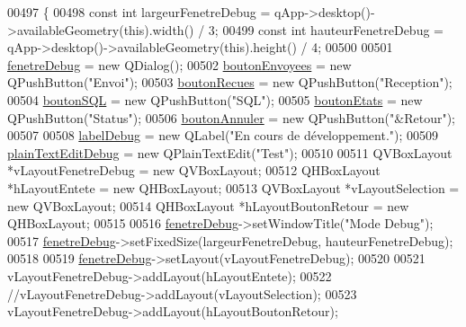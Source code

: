 \begin{DoxyCode}
00497 \{
00498     \textcolor{keyword}{const} \textcolor{keywordtype}{int} largeurFenetreDebug = qApp->desktop()->availableGeometry(\textcolor{keyword}{this}).width() / 3;
00499     \textcolor{keyword}{const} \textcolor{keywordtype}{int} hauteurFenetreDebug = qApp->desktop()->availableGeometry(\textcolor{keyword}{this}).height() / 4;
00500 
00501     \hyperlink{class_i_h_m_rov_a393d23f9256a9db063dfef11d95cdc06}{fenetreDebug} = \textcolor{keyword}{new} QDialog();
00502     \hyperlink{class_i_h_m_rov_a7a441ed53b0066edaf1f0acbea24e777}{boutonEnvoyees} = \textcolor{keyword}{new} QPushButton(\textcolor{stringliteral}{"Envoi"});
00503     \hyperlink{class_i_h_m_rov_ae56bf1c744f0fc393ef517e0e66b0d12}{boutonRecues} = \textcolor{keyword}{new} QPushButton(\textcolor{stringliteral}{"Reception"});
00504     \hyperlink{class_i_h_m_rov_a5dca475dd63a04c96386855a84c5effb}{boutonSQL} = \textcolor{keyword}{new} QPushButton(\textcolor{stringliteral}{"SQL"});
00505     \hyperlink{class_i_h_m_rov_a82f0ceba3dadd7a3d3251c236bf212a4}{boutonEtats} = \textcolor{keyword}{new} QPushButton(\textcolor{stringliteral}{"Status"});
00506     \hyperlink{class_i_h_m_rov_a4a6fec1b4a86c93c1d0d62d66804db5c}{boutonAnnuler} = \textcolor{keyword}{new} QPushButton(\textcolor{stringliteral}{"&Retour"});
00507 
00508     \hyperlink{class_i_h_m_rov_a667455d332d2abf2e42b897e6cc632f8}{labelDebug} = \textcolor{keyword}{new} QLabel(\textcolor{stringliteral}{"En cours de développement."});
00509     \hyperlink{class_i_h_m_rov_ae2a7bec24a52ffd9e53baf1185ab6cd7}{plainTextEditDebug} = \textcolor{keyword}{new} QPlainTextEdit(\textcolor{stringliteral}{"Test"});
00510 
00511     QVBoxLayout *vLayoutFenetreDebug = \textcolor{keyword}{new} QVBoxLayout;
00512     QHBoxLayout *hLayoutEntete = \textcolor{keyword}{new} QHBoxLayout;
00513     QVBoxLayout *vLayoutSelection = \textcolor{keyword}{new} QVBoxLayout;
00514     QHBoxLayout *hLayoutBoutonRetour = \textcolor{keyword}{new} QHBoxLayout;
00515 
00516     \hyperlink{class_i_h_m_rov_a393d23f9256a9db063dfef11d95cdc06}{fenetreDebug}->setWindowTitle(\textcolor{stringliteral}{"Mode Debug"});
00517     \hyperlink{class_i_h_m_rov_a393d23f9256a9db063dfef11d95cdc06}{fenetreDebug}->setFixedSize(largeurFenetreDebug, hauteurFenetreDebug);
00518 
00519     \hyperlink{class_i_h_m_rov_a393d23f9256a9db063dfef11d95cdc06}{fenetreDebug}->setLayout(vLayoutFenetreDebug);
00520 
00521     vLayoutFenetreDebug->addLayout(hLayoutEntete);
00522     \textcolor{comment}{//vLayoutFenetreDebug->addLayout(vLayoutSelection);}
00523     vLayoutFenetreDebug->addLayout(hLayoutBoutonRetour);

\end{DoxyCode}
